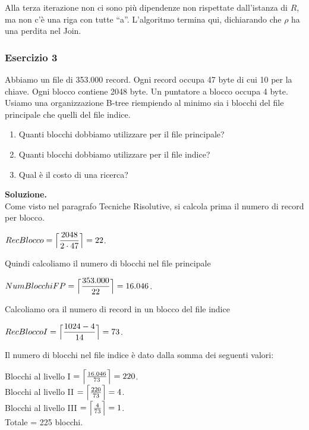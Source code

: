 Alla terza iterazione non ci sono più dipendenze non rispettate dall'istanza di $R$, ma non c'è una riga con tutte ``a''.
L'algoritmo termina qui, dichiarando che $\rho$ ha una perdita nel Join.
\subsubsection{Esercizio 3}
Abbiamo un file di 353.000 record. Ogni record occupa 47 byte di cui 10 per la chiave. Ogni blocco contiene 2048 byte. 
Un puntatore a blocco occupa 4 byte. Usiamo una organizzazione B-tree riempiendo al minimo sia i blocchi del file 
principale che quelli del file indice.

\begin{enumerate}
 \item Quanti blocchi dobbiamo utilizzare per il file principale? 
 \item Quanti blocchi dobbiamo utilizzare per il file indice?
 \item Qual è il costo di una ricerca?
\end{enumerate}

\noindent\textbf{\fontsize{14pt}{1em}Soluzione.}\\
Come visto nel paragrafo Tecniche Risolutive, si calcola prima il numero di record per blocco.
\begin{center}
 $RecBlocco = \Bigl\lceil \dfrac{2048}{2\cdot 47} \Bigr\rceil = 22$.\\
\end{center}
Quindi calcoliamo il numero di blocchi nel file principale
\begin{center}
 $NumBlocchiFP = \Bigl\lceil \dfrac{353.000}{22} \Bigr\rceil = 16.046$.\\
\end{center}
Calcoliamo ora il numero di record in un blocco del file indice
\begin{center}
 $RecBloccoI = \Bigl\lceil \dfrac{1024-4}{14} \Bigr\rceil = 73$.\\
\end{center}
Il numero di blocchi nel file indice è dato dalla somma dei seguenti valori:
\begin{center}
 Blocchi al livello I $= \Bigl\lceil \frac{16.046}{73} \Bigr\rceil = 220$.\\

 Blocchi al livello II $= \Bigl\lceil \frac{220}{73} \Bigr\rceil = 4$.\\

 Blocchi al livello III $= \Bigl\lceil \frac{4}{73} \Bigr\rceil = 1$.\\
 
 Totale = 225 blocchi.
\end{center}


